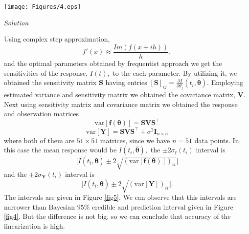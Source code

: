 \documentclass[11pt]{article}
\begin{document}
\begin{enumerate}
\begin{figure*}[!ht]
\centering
      \texttt{[image: Figures/4.eps]}
\caption{Data, $\pm2\sigma_\mathbf{f}$ and $\pm 2\sigma_\mathbf{Y}$ interval using data in $\mathbf{SIR.txt}$.}
\label{fig5}
\end{figure*}



{\em Solution} 


Using complex step approximation, $$f'(x)\approx\frac{Im(f(x+ih))}{h},$$  and the optimal parameters obtained by frequentist approach we get the sensitivities of the response, $I(t),$ to the each parameter. By utilizing it, we obtained the sensitivity matrix $\mathbf{S}$ having entries $[\mathbf{S}]_{ij} = \frac{ \partial I}{\partial \theta_j}(t_i, \pmb{\bar\theta}).$ Employing  estimated variance and sensitivity matrix we obtained the covariance matrix, $\mathbf{V}.$ Next using sensitivity matrix and  covariance matrix we obtained the response and observation matrices
$$\mbox{var}[\pmb{f(\theta)}] = \mathbf{SVS}^\top$$
$$\mbox{var}[\mathbf{Y}] = \mathbf{SVS}^\top + \sigma^2 \mathbf{I}_{n\times n}$$ where both of them are $51\times 51$ matrices, since we have $n=51$ data points. In this case the mean response would be $I(t_i,\pmb{\bar \theta}),$ the $\pm 2\sigma_{\pmb{f}}(t_i)$ interval is 
$$ \bigg[I(t_i,\pmb{\bar \theta})\pm 2\sqrt{(\mbox{var}[\pmb{f(\theta)}])_{ii}} \bigg]$$  and the $\pm 2\sigma_{\mathbf{Y}}(t_i)$ interval is 
$$ \bigg[I(t_i,\pmb{\bar \theta})\pm 2\sqrt{(\mbox{var}[\mathbf{Y}])_{ii}} \bigg].$$ The intervals are given in Figure \ref{fig5}.  We can observe that this intervals are narrower than Bayesian $95\%$ credible and prediction interval given in Figure \ref{fig4}. But the difference is not big, so we can conclude that accuracy of the linearization is high.

\end{enumerate}
\end{document}
